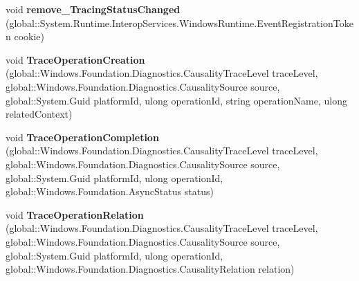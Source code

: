\begin{DoxyCompactItemize}
\mbox{\label{interface_windows_1_1_foundation_1_1_diagnostics_1_1_i_async_causality_tracer_statics_a0b28a0699db651012d252a2063f84c0a}} 
void {\bfseries remove\+\_\+\+Tracing\+Status\+Changed} (global\+::\+System.\+Runtime.\+Interop\+Services.\+Windows\+Runtime.\+Event\+Registration\+Token cookie)
\item 
\mbox{\label{interface_windows_1_1_foundation_1_1_diagnostics_1_1_i_async_causality_tracer_statics_a38bdec695d719f8d62636334dcfb8dc5}} 
void {\bfseries Trace\+Operation\+Creation} (global\+::\+Windows.\+Foundation.\+Diagnostics.\+Causality\+Trace\+Level trace\+Level, global\+::\+Windows.\+Foundation.\+Diagnostics.\+Causality\+Source source, global\+::\+System.\+Guid platform\+Id, ulong operation\+Id, string operation\+Name, ulong related\+Context)
\item 
\mbox{\label{interface_windows_1_1_foundation_1_1_diagnostics_1_1_i_async_causality_tracer_statics_ac5e3ac3c90be930394f03ec531d863cd}} 
void {\bfseries Trace\+Operation\+Completion} (global\+::\+Windows.\+Foundation.\+Diagnostics.\+Causality\+Trace\+Level trace\+Level, global\+::\+Windows.\+Foundation.\+Diagnostics.\+Causality\+Source source, global\+::\+System.\+Guid platform\+Id, ulong operation\+Id, global\+::\+Windows.\+Foundation.\+Async\+Status status)
\item 
\mbox{\label{interface_windows_1_1_foundation_1_1_diagnostics_1_1_i_async_causality_tracer_statics_ad69dacbb1c6dd0ede745f227c69d8d16}} 
void {\bfseries Trace\+Operation\+Relation} (global\+::\+Windows.\+Foundation.\+Diagnostics.\+Causality\+Trace\+Level trace\+Level, global\+::\+Windows.\+Foundation.\+Diagnostics.\+Causality\+Source source, global\+::\+System.\+Guid platform\+Id, ulong operation\+Id, global\+::\+Windows.\+Foundation.\+Diagnostics.\+Causality\+Relation relation)
\item 
\mbox{\label{interface_windows_1_1_foundation_1_1_diagnostics_1_1_i_async_causality_tracer_statics_a749785813f9caf99b9ac0f4fd89700a2}} 

\end{DoxyCompactItemize}
